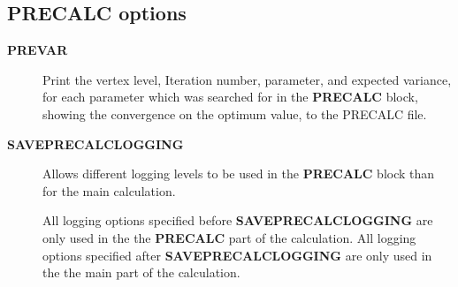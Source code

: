 \documentclass[openany,a4paper,10pt]{manual}
\begin{document}
\subsection{PRECALC options}
\begin{description}
\item[\textbf{PREVAR}]
Print the vertex level, Iteration number, parameter, and expected
variance, for each parameter which was searched for in the \textbf{PRECALC}
block, showing the convergence on the optimum value, to the PRECALC
file.

\item[\textbf{SAVEPRECALCLOGGING}]
Allows different logging levels to be used in the \textbf{PRECALC} block
than for the main calculation.

All logging options specified before \textbf{SAVEPRECALCLOGGING} are only
used in the the \textbf{PRECALC} part of the calculation.  All logging
options specified after  \textbf{SAVEPRECALCLOGGING} are only used in the
the main part of the calculation.

\end{description}
\end{document}
